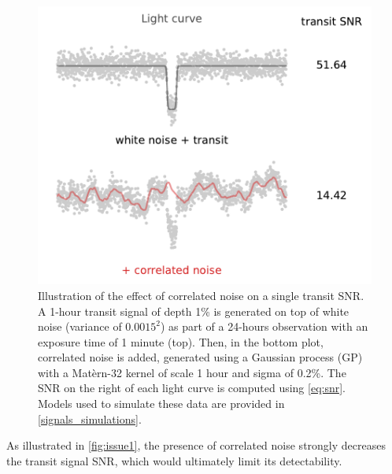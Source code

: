 \documentclass[modern]{aastex631}
\begin{document}
\begin{figure}[H]
    \begin{centering}
        \includegraphics[width=0.6\linewidth]{../workflows/plot_issues/figures/issue1.pdf}
        \caption{Illustration of the effect of correlated noise on a single transit SNR. A 1-hour transit signal of depth 1\% is generated on top of white noise (variance of $0.0015^2$) as part of a 24-hours observation with an exposure time of 1 minute (top). Then, in the bottom plot, correlated noise is added, generated using a Gaussian process (GP) with a Matèrn-32 kernel of scale 1 hour and sigma of 0.2\%. The SNR on the right of each light curve is computed using \autoref{eq:snr}. Models used to simulate these data are provided in \autoref{signals_simulations}.}
        \label{fig:issue1}
    \end{centering}
\end{figure}

As illustrated in \autoref{fig:issue1}, the presence of correlated noise strongly decreases the transit signal SNR, which would ultimately limit its detectability.
\end{document}
